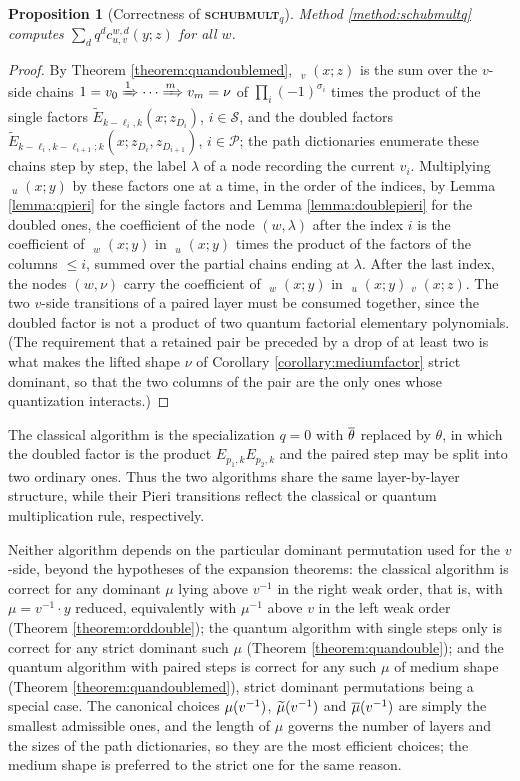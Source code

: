 \documentclass{amsart}
\newtheorem{proposition}[lemma]{Proposition}
\theoremstyle{definition}
\theoremstyle{remark}
\numberwithin{equation}{section}
\DeclareMathOperator{\qsch}{\widetilde{\mathfrak{S}}}
\newcommand{\qelem}{\widetilde{E}}
\begin{document}
\begin{proposition}[Correctness of \textbf{\textsc{schubmult}}$_q$] \label{prop:schubmultqcorrect}
Method \ref{method:schubmultq} computes $\sum_dq^dc_{u,v}^{w,d}(y;z)$ for all $w$.
\end{proposition}
\begin{proof}
By Theorem \ref{theorem:quandoublemed}, $\qsch_v(x;z)$ is the sum over the $v$-side chains $1=v_0\xRightarrow{1}\cdots\xRightarrow{m}v_m=\nu$ of $\prod_i(-1)^{\sigma_i}$ times the product of the single factors $\qelem_{k-\ell_i,k}(x;z_{D_i})$, $i\in\mathcal S$, and the doubled factors $\qelem_{k-\ell_i,k-\ell_{i+1};k}(x;z_{D_i},z_{D_{i+1}})$, $i\in\mathcal P$; the path dictionaries enumerate these chains step by step, the label $\lambda$ of a node recording the current $v_i$. Multiplying $\qsch_u(x;y)$ by these factors one at a time, in the order of the indices, by Lemma \ref{lemma:qpieri} for the single factors and Lemma \ref{lemma:doublepieri} for the doubled ones, the coefficient of the node $(w,\lambda)$ after the index $i$ is the coefficient of $\qsch_w(x;y)$ in $\qsch_u(x;y)$ times the product of the factors of the columns $\leq i$, summed over the partial chains ending at $\lambda$. After the last index, the nodes $(w,\nu)$ carry the coefficient of $\qsch_w(x;y)$ in $\qsch_u(x;y)\qsch_v(x;z)$. The two $v$-side transitions of a paired layer must be consumed together, since the doubled factor is not a product of two quantum factorial elementary polynomials. (The requirement that a retained pair be preceded by a drop of at least two is what makes the lifted shape $\nu$ of Corollary \ref{corollary:mediumfactor} strict dominant, so that the two columns of the pair are the only ones whose quantization interacts.)
\end{proof}

The classical algorithm is the specialization $q=0$ with $\overline{\theta}$ replaced by $\theta$, in which the doubled factor is the product $E_{p_1,k}E_{p_2,k}$ and the paired step may be split into two ordinary ones. Thus the two algorithms share the same layer-by-layer structure, while their Pieri transitions reflect the classical or quantum multiplication rule, respectively.

Neither algorithm depends on the particular dominant permutation used for the $v$-side, beyond the hypotheses of the expansion theorems: the classical algorithm is correct for any dominant $\mu$ lying above $v^{-1}$ in the right weak order, that is, with $\mu=v^{-1}\cdot y$ reduced, equivalently with $\mu^{-1}$ above $v$ in the left weak order (Theorem \ref{theorem:orddouble}); the quantum algorithm with single steps only is correct for any strict dominant such $\mu$ (Theorem \ref{theorem:quandouble}); and the quantum algorithm with paired steps is correct for any such $\mu$ of medium shape (Theorem \ref{theorem:quandoublemed}), strict dominant permutations being a special case. The canonical choices $\mu(v^{-1})$, $\widetilde{\mu}(v^{-1})$ and $\overline{\mu}(v^{-1})$ are simply the smallest admissible ones, and the length of $\mu$ governs the number of layers and the sizes of the path dictionaries, so they are the most efficient choices; the medium shape is preferred to the strict one for the same reason.
\end{document}
